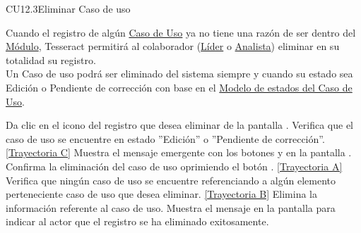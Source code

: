 	\begin{UseCase}{CU12.3}{Eliminar Caso de uso}{
	
		Cuando el registro de algún \hyperlink{casoUso}{Caso de Uso} ya no tiene una razón de ser dentro del \hyperlink{moduloEntidad}{Módulo}, Tesseract permitirá al colaborador (\hyperlink{jefe}{Líder} o \hyperlink{analista}{Analista}) eliminar en su totalidad su registro. \\
	
		Un Caso de uso podrá ser eliminado del sistema siempre y cuando su estado sea Edición o Pendiente de corrección con base en el \hyperlink{edoCU}{Modelo de estados del Caso de Uso}. 
}
	\end{UseCase}
	\begin{UCtrayectoria}
		\UCpaso[\UCactor] Da clic en el icono \eliminar del registro que desea eliminar de la pantalla .
		\UCpaso[\UCsist] Verifica que el caso de uso se encuentre en estado ''Edición'' o ''Pendiente de corrección''. \hyperlink{CU12-3:TAC}{[Trayectoria C]}
		\UCpaso[\UCsist] Muestra el mensaje emergente  con los botones  y  en la pantalla .
		\UCpaso[\UCactor] Confirma la eliminación del caso de uso oprimiendo el botón . \hyperlink{CU12-3:TAA}{[Trayectoria A]}
		\UCpaso[\UCsist] Verifica que ningún caso de uso se encuentre referenciando a algún elemento perteneciente caso de uso que desea eliminar. \hyperlink{CU12-3:TAB}{[Trayectoria B]}
		\UCpaso[\UCsist] Elimina la información referente al caso de uso.
		\UCpaso[\UCsist] Muestra el mensaje  en la pantalla  para indicar al actor que el registro se ha eliminado exitosamente.
	\end{UCtrayectoria}		
